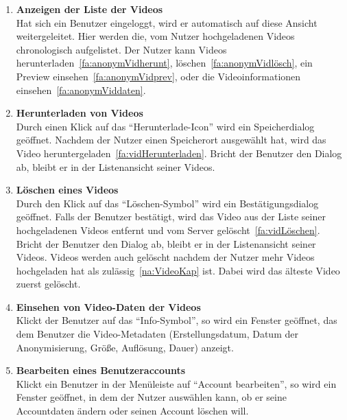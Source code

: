\begin{enumerate}
\item \label{fa:anonymVidAnzeigen}\textbf{Anzeigen der Liste der  Videos} \hfill \\
Hat sich ein Benutzer eingeloggt, wird er automatisch auf diese Ansicht weitergeleitet. Hier werden die, vom Nutzer hochgeladenen Videos chronologisch aufgelistet. Der Nutzer kann Videos herunterladen~\eqref{fa:anonymVidherunt}, löschen~\eqref{fa:anonymVidlösch}, ein Preview einsehen~\eqref{fa:anonymVidprev}, oder die Videoinformationen einsehen~\eqref{fa:anonymViddaten}.

\item \label{fa:anonymVidherunt}\textbf{Herunterladen von  Videos} \hfill \\
Durch einen Klick auf das ``Herunterlade-Icon'' wird ein Speicherdialog geöffnet. Nachdem der Nutzer einen Speicherort ausgewählt hat, wird das Video heruntergeladen~\eqref{fa:vidHerunterladen}. Bricht der Benutzer den Dialog ab, bleibt er in der Listenansicht seiner Videos.

\item \label{fa:anonymVidlösch}\textbf{Löschen eines  Videos} \hfill \\
Durch den Klick auf das ``Löschen-Symbol'' wird ein Bestätigungsdialog geöffnet. Falls der Benutzer bestätigt, wird das Video aus der Liste seiner hochgeladenen Videos entfernt und vom Server gelöscht~\eqref{fa:vidLöschen}. Bricht der Benutzer den Dialog ab, bleibt er in der Listenansicht seiner Videos. Videos werden auch gelöscht nachdem der Nutzer mehr Videos hochgeladen hat als zulässig~\eqref{na:VideoKap} ist. Dabei wird das älteste Video zuerst gelöscht.

\item \label{fa:anonymViddaten}\textbf{Einsehen von Video-Daten der  Videos} \hfill \\
Klickt der Benutzer auf das ``Info-Symbol'', so wird ein Fenster geöffnet, das dem Benutzer die Video-\gls{Metadaten} (Erstellungsdatum, Datum der Anonymisierung, Größe, Auflösung, Dauer) anzeigt.

\item \label{fa:accBearb}\textbf{Bearbeiten eines Benutzeraccounts} \hfill \\
Klickt ein Benutzer in der Menüleiste auf ``Account bearbeiten'', so wird ein Fenster geöffnet, in dem der Nutzer auswählen kann, ob er seine Accountdaten ändern oder seinen Account löschen will.


\end{enumerate}
